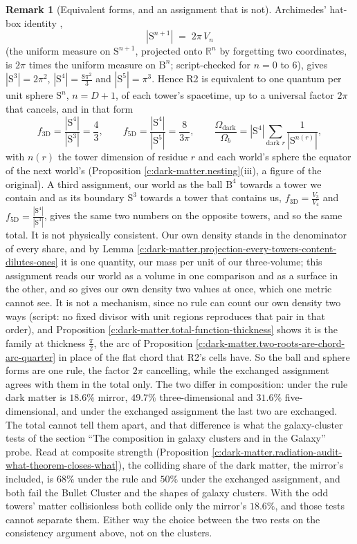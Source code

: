\documentclass[11pt]{article}
\theoremstyle{definition}
\newtheorem{remark}[theorem]{Remark}
\theoremstyle{plain}
\newcommand{\changedmark}[2]{\marginpar{\raggedright\scriptsize\color{#1}#2}}
\providecommand{\B}{}\renewcommand{\B}{\mathrm{B}}
\providecommand{\R}{}\renewcommand{\R}{\mathbb{R}}
\providecommand{\Sph}{}\renewcommand{\Sph}{\mathrm{S}}
\begin{document}
\begin{remark}[Equivalent forms, and an assignment that is not]\label{c:note.dark-matter.equivalent-forms-assignment-not}
\changedmark{BurntOrange}{changed since the deposit}
Archimedes' hat-box identity \cite{Archimedes},
\[
|\Sph^{n+1}| \;=\; 2\pi\,V_{n}
\]
(the uniform measure on $\Sph^{n+1}$, projected onto $\R^{n}$ by forgetting two coordinates, is $2\pi$ times the uniform measure on $\B^{n}$; script-checked for $n = 0$ to $6$), gives $|\Sph^{3}| = 2\pi^{2}$, $|\Sph^{4}| = \tfrac{8\pi^{2}}{3}$ and $|\Sph^{5}| = \pi^{3}$. Hence R2 is equivalent to one quantum per unit sphere $\Sph^{n}$, $n = D + 1$, of each tower's spacetime, up to a universal factor $2\pi$ that cancels, and in that form
\[
f_{3\mathrm{D}} = \frac{|\Sph^{4}|}{|\Sph^{3}|} = \frac{4}{3}, \qquad f_{5\mathrm{D}} = \frac{|\Sph^{4}|}{|\Sph^{5}|} = \frac{8}{3\pi}, \qquad
\frac{\Omega_{\mathrm{dark}}}{\Omega_{b}} = |\Sph^{4}|\sum_{\text{dark }r}\frac{1}{|\Sph^{n(r)}|},
\]
with $n(r)$ the tower dimension of residue $r$ and each world's sphere the equator of the next world's (Proposition \ref{c:dark-matter.nesting}(iii), a figure of the original). A third assignment, our world as the ball $\B^{4}$ towards a tower we contain and as its boundary $\Sph^{3}$ towards a tower that contains us, $f_{3\mathrm{D}} = \tfrac{V_{3}}{V_{4}}$ and $f_{5\mathrm{D}} = \tfrac{|\Sph^{4}|}{|\Sph^{3}|}$, gives the same two numbers on the opposite towers, and so the same total. It is not physically consistent. Our own density stands in the denominator of every share, and by Lemma \ref{c:dark-matter.projection-every-towers-content-dilutes-ones} it is one quantity, our mass per unit of our three-volume; this assignment reads our world as a volume in one comparison and as a surface in the other, and so gives our own density two values at once, which one metric cannot see. It is not a mechanism, since no rule can count our own density two ways (script: no fixed divisor with unit regions reproduces that pair in that order), and Proposition \ref{c:dark-matter.total-function-thickness} shows it is the family at thickness $\tfrac{\pi}{2}$, the arc of Proposition \ref{c:dark-matter.two-roots-are-chord-arc-quarter} in place of the flat chord that R2's cells have. So the ball and sphere forms are one rule, the factor $2\pi$ cancelling, while the exchanged assignment agrees with them in the total only. The two differ in composition: under the rule dark matter is $18.6\%$ mirror, $49.7\%$ three-dimensional and $31.6\%$ five-dimensional, and under the exchanged assignment the last two are exchanged. The total cannot tell them apart, and that difference is what the galaxy-cluster tests of the section ``The composition in galaxy clusters and in the Galaxy'' probe. Read at composite strength (Proposition \ref{c:dark-matter.radiation-audit-what-theorem-closes-what}), the colliding share of the dark matter, the mirror's included, is $68\%$ under the rule and $50\%$ under the exchanged assignment, and both fail the Bullet Cluster and the shapes of galaxy clusters. With the odd towers' matter collisionless both collide only the mirror's $18.6\%$, and those tests cannot separate them. Either way the choice between the two rests on the consistency argument above, not on the clusters.
\end{remark}
\end{document}
